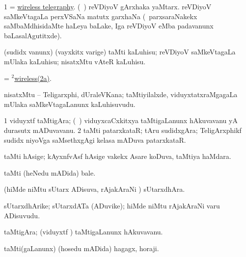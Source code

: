 \bentry
{} 
\gl{\nA}
\bmng
\bnum
\num{1} = \hyperlink{wireless telegraphy}{wireless telegraphy}. 
 (\kanmu\ \birx) 
\hypertarget{wireless(2)2a}{} 
\banum
{} reVDiyoV gArxhaka yaMtarx. 
 reVDiyoV saMkeVtagaLa perxVSaNa matutx garxhaNa (\kanmu\ parxsaraNakekx saMbaMdhisidaMte haLeya baLake, Iga reVDiyoV eMba padavanunx baLasalAgutitxde). 
\eanum
\numie
\enum
\emng
\eentry

\bentry
{} 
\gl{\akirx}
\bmng
(sudidx \mo vanunx) (vayxkitx \mo varige) taMti kaLuhisu; reVDiyoV saMkeVtagaLa mUlaka kaLuhisu; nisatxMtu vAteR kaLuhisu. 
\emng
\eentry

\bentry
{}
\gl{\nA}
\bmng
= \hyperlink{wireless(2)2a}{$^2$wireless(2a)}. 
\emng
\eentry

\bentry
{}
\gl{\nA}
\bmng
nisatxMtu -- Teligarxphi, dUraleVKana; taMtiyilalxde, viduyxtatxraMgagaLa mUlaka saMkeVtagaLanunx kaLuhisuvudu. 
\emng
\eentry

\bentry
{}
\gl{\nA} 
\bmng
\bnum
\num{1} viduyxtf taMtigAra; (\kanmu\ \ame) viduyxcaCxkitxya taMtigaLanunx hAkuvavanu yA durasutx mADuvavanu. 
\num{2} taMti patarxkataR; tAru sudidxgAra; TeligArxphikf sudidx niyoVga saMsethxgAgi kelasa mADuva patarxkataR. 
\enum
\emng
\eentry

\bentry
{}
\gl{\nA}
\bmng
taMti hAsige; kAyxnfvAsf hAsige \mo vakekx Asare koDuva, taMtiya haMdara. 
\emng
\eentry

\bentry
{}
\gl{\nA}
\bmng
taMti (heNedu mADida) bale. 
\emng
\eentry

\bentry
{}
\gl{\nA}
\bmng
(hiMde niMtu sUtarx ADisuva, rAjakAraNi \mo) sUtarxdhAra. 
\emng
\eentry

\bentry
{}
\gl{\nA}
\bmng
sUtarxdhArike; sUtarxdATa (ADuvike); hiMde niMtu rAjakAraNi \mo varu ADisuvudu. 
\emng
\eentry

\bentry
{}
\gl{\nA}
\bmng
taMtigAra; (viduyxtf \mo) taMtigaLanunx hAkuvavanu. 
\emng
\eentry

\bentry
{}
\gl{\nA}
\bmng
taMti(gaLanunx) (hosedu mADida) hagagx, horaji. 
\emng
\eentry

